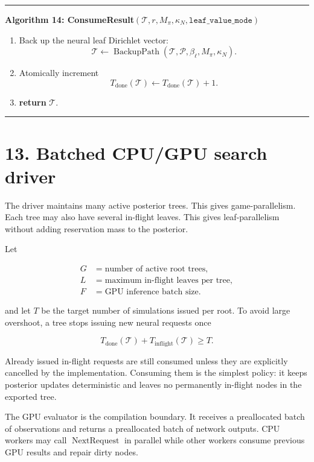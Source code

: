 \documentclass[11pt]{article}
\newcommand{\Tree}{\mathcal{T}}
\newcommand{\Path}{\mathcal{P}}
\newcommand{\BackupPath}{\operatorname{BackupPath}}
\newcommand{\NextRequest}{\operatorname{NextRequest}}
\newenvironment{algorithmblock}[1]
{
  \par\medskip
  \noindent\hrule\par\smallskip
  \noindent\textbf{#1}
  \par\smallskip
}
{
  \par\smallskip\noindent\hrule\par\medskip
}
\newcommand{\Return}{\textbf{return }}
\begin{document}
\begin{algorithmblock}{Algorithm 14: ConsumeResult\((\Tree,r,M_\pi,\kappa_N,\texttt{leaf\_value\_mode})\)}
\begin{enumerate}[leftmargin=2em]
  \item Back up the neural leaf Dirichlet vector:
  \[
  \Tree
  \gets
  \BackupPath(\Tree,\Path,\beta_\ell,M_\pi,\kappa_N).
  \]

  \item Atomically increment
  \[
  T_{\mathrm{done}}(\Tree)
  \gets
  T_{\mathrm{done}}(\Tree)+1.
  \]

  \item \Return \(\Tree\).
\end{enumerate}

\end{algorithmblock}


\section*{13. Batched CPU/GPU search driver}

The driver maintains many active posterior trees. This gives game-parallelism.
Each tree may also have several in-flight leaves. This gives leaf-parallelism
without adding reservation mass to the posterior.

Let

\[
\begin{aligned}
G &= \text{number of active root trees},\\
L &= \text{maximum in-flight leaves per tree},\\
F &= \text{GPU inference batch size}.
\end{aligned}
\]

and let \(T\) be the target number of simulations issued per root. To avoid
large overshoot, a tree stops issuing new neural requests once

\[
T_{\mathrm{done}}(\Tree)+T_{\mathrm{inflight}}(\Tree)\ge T.
\]

Already issued in-flight requests are still consumed unless they are explicitly
cancelled by the implementation. Consuming them is the simplest policy: it keeps
posterior updates deterministic and leaves no permanently in-flight nodes in the
exported tree.

The GPU evaluator is the compilation boundary. It receives a preallocated batch
of observations and returns a preallocated batch of network outputs. CPU workers
may call \(\NextRequest\) in parallel while other workers consume previous GPU
results and repair dirty nodes.
\end{document}
